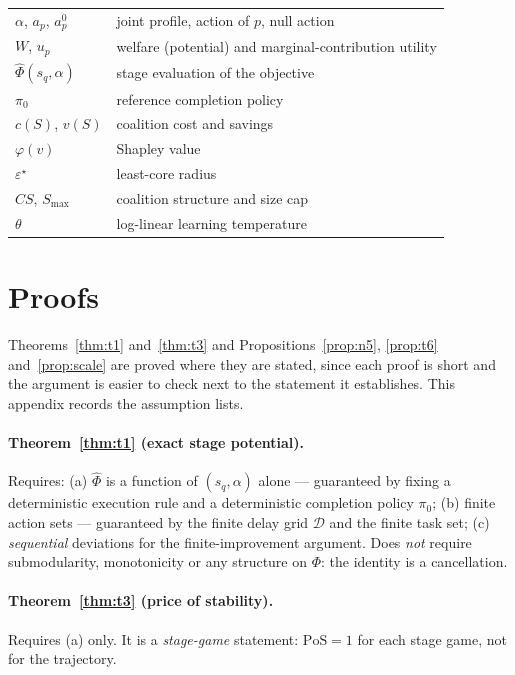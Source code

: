 \documentclass[preprint, 3p, review, 12pt]{elsarticle}
\theoremstyle{definition}
\begin{document}
\begin{table}[h!]
\begin{tabular}{@{}ll@{}}
$\alpha$, $a_p$, $a_p^{0}$ & joint profile, action of $p$, null action \\
$W$, $u_p$ & welfare (potential) and marginal-contribution utility \\
$\widehat{\Phi}(s_q,\alpha)$ & stage evaluation of the objective \\
$\pi_0$ & reference completion policy \\
$c(S)$, $v(S)$ & coalition cost and savings \\
$\varphi(v)$ & Shapley value \\
$\varepsilon^\star$ & least-core radius \\
$CS$, $S_{\max}$ & coalition structure and size cap \\
$\theta$ & log-linear learning temperature \\
\bottomrule
\end{tabular}
\end{table}

\section{Proofs}
\label{app:proofs}
Theorems~\ref{thm:t1} and~\ref{thm:t3} and Propositions~\ref{prop:n5}, \ref{prop:t6}
and~\ref{prop:scale} are proved where they are stated, since each proof is short and the
argument is easier to check next to the statement it establishes. This appendix records the
assumption lists.

\paragraph{Theorem~\ref{thm:t1} (exact stage potential).} Requires: (a) $\widehat{\Phi}$ is a
function of $(s_q,\alpha)$ alone --- guaranteed by fixing a deterministic execution rule and a
deterministic completion policy $\pi_0$; (b) finite action sets --- guaranteed by the finite
delay grid $\mathcal{D}$ and the finite task set; (c) \emph{sequential} deviations for the
finite-improvement argument. Does \emph{not} require submodularity, monotonicity or any
structure on $\Phi$: the identity is a cancellation.

\paragraph{Theorem~\ref{thm:t3} (price of stability).} Requires (a) only. It is a
\emph{stage-game} statement: $\mathrm{PoS}=1$ for each stage game, not for the trajectory.
\end{document}
